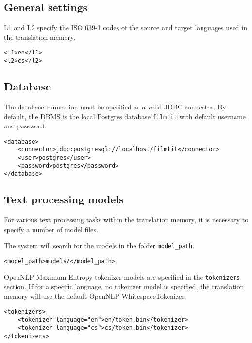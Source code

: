 \subsection{General settings}
L1 and L2 specify the ISO 639-1 codes of the source and target languages used in the translation memory.
\begin{lstlisting}
<l1>en</l1>
<l2>cs</l2>
\end{lstlisting}

\subsection{Database}

The database connection must be specified as a valid JDBC connector. By default, the DBMS is the local Postgres database \verb#filmtit# with default username and password.

\begin{lstlisting}
<database>
    <connector>jdbc:postgresql://localhost/filmtit</connector>
    <user>postgres</user>
    <password>postgres</password>
</database>
\end{lstlisting}

\subsection{Text processing models}

For various text processing tasks within the translation memory, 
it is necessary to specify a number of model files.

The system will search for the models in the folder \verb#model_path#.
\begin{lstlisting}
<model_path>models/</model_path>
\end{lstlisting}

OpenNLP Maximum Entropy tokenizer models are specified in the \verb#tokenizers# section. If for a specific language, no tokenizer model is specified, the translation memory will use the default OpenNLP WhitespaceTokenizer.
\begin{lstlisting}
<tokenizers>
    <tokenizer language="en">en/token.bin</tokenizer>
    <tokenizer language="cs">cs/token.bin</tokenizer>
</tokenizers>
\end{lstlisting}

